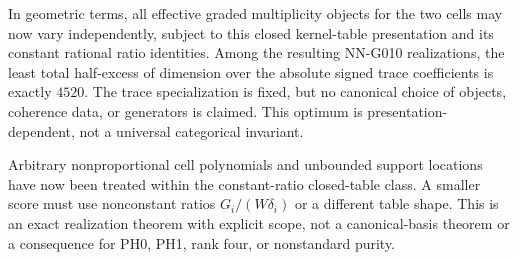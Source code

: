 In geometric terms, all effective graded multiplicity objects
for the two cells may now vary independently, subject to this
closed kernel-table presentation and its constant rational
ratio identities. Among the resulting NN-G010 realizations,
the least total half-excess of dimension over the absolute
signed trace coefficients is exactly $4520$. The trace
specialization is fixed, but no canonical choice of objects,
coherence data, or generators is claimed. This optimum is
presentation-dependent, not a universal categorical invariant.

Arbitrary nonproportional cell polynomials and
unbounded support locations have now been treated
within the constant-ratio closed-table class. A
smaller score must use nonconstant ratios
$G_i/(W\delta_i)$ or a different table shape.
This is an exact realization theorem with explicit
scope, not a canonical-basis theorem or a consequence
for PH0, PH1, rank four, or nonstandard purity.

